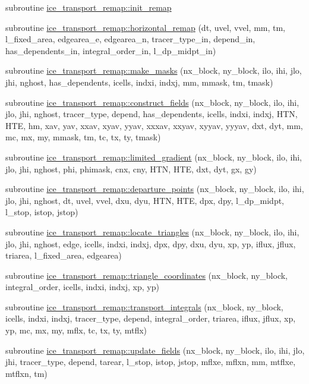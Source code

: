 \begin{DoxyCompactItemize}
\item 
subroutine \hyperlink{namespaceice__transport__remap_ae1b446db8b6220961bfcacd0c9b57fd4}{ice\_\-transport\_\-remap::init\_\-remap}
\item 
subroutine \hyperlink{namespaceice__transport__remap_af549caf7a8f27fcbe1cc3d9f8df4bacd}{ice\_\-transport\_\-remap::horizontal\_\-remap} (dt, uvel, vvel, mm, tm, l\_\-fixed\_\-area, edgearea\_\-e, edgearea\_\-n, tracer\_\-type\_\-in, depend\_\-in, has\_\-dependents\_\-in, integral\_\-order\_\-in, l\_\-dp\_\-midpt\_\-in)
\item 
subroutine \hyperlink{namespaceice__transport__remap_a9a9fe0af7f01eed20d6df09ed2e8dc2a}{ice\_\-transport\_\-remap::make\_\-masks} (nx\_\-block, ny\_\-block, ilo, ihi, jlo, jhi, nghost, has\_\-dependents, icells, indxi, indxj, mm, mmask, tm, tmask)
\item 
subroutine \hyperlink{namespaceice__transport__remap_a4c7f753ed3abe19124a7e719e3424dae}{ice\_\-transport\_\-remap::construct\_\-fields} (nx\_\-block, ny\_\-block, ilo, ihi, jlo, jhi, nghost, tracer\_\-type, depend, has\_\-dependents, icells, indxi, indxj, HTN, HTE, hm, xav, yav, xxav, xyav, yyav, xxxav, xxyav, xyyav, yyyav, dxt, dyt, mm, mc, mx, my, mmask, tm, tc, tx, ty, tmask)
\item 
subroutine \hyperlink{namespaceice__transport__remap_ad0f2932484bf98ec16810e79b50b9117}{ice\_\-transport\_\-remap::limited\_\-gradient} (nx\_\-block, ny\_\-block, ilo, ihi, jlo, jhi, nghost, phi, phimask, cnx, cny, HTN, HTE, dxt, dyt, gx, gy)
\item 
subroutine \hyperlink{namespaceice__transport__remap_a6b993110f808c259c52b05216684684f}{ice\_\-transport\_\-remap::departure\_\-points} (nx\_\-block, ny\_\-block, ilo, ihi, jlo, jhi, nghost, dt, uvel, vvel, dxu, dyu, HTN, HTE, dpx, dpy, l\_\-dp\_\-midpt, l\_\-stop, istop, jstop)
\item 
subroutine \hyperlink{namespaceice__transport__remap_a5ed79661ddd56d26d4e863b7ec1b9a0a}{ice\_\-transport\_\-remap::locate\_\-triangles} (nx\_\-block, ny\_\-block, ilo, ihi, jlo, jhi, nghost, edge, icells, indxi, indxj, dpx, dpy, dxu, dyu, xp, yp, iflux, jflux, triarea, l\_\-fixed\_\-area, edgearea)
\item 
subroutine \hyperlink{namespaceice__transport__remap_a0118e9be4eed6545abe6b6d08ebea458}{ice\_\-transport\_\-remap::triangle\_\-coordinates} (nx\_\-block, ny\_\-block, integral\_\-order, icells, indxi, indxj, xp, yp)
\item 
subroutine \hyperlink{namespaceice__transport__remap_a36c63f1390ec491939f47e64dab35e1e}{ice\_\-transport\_\-remap::transport\_\-integrals} (nx\_\-block, ny\_\-block, icells, indxi, indxj, tracer\_\-type, depend, integral\_\-order, triarea, iflux, jflux, xp, yp, mc, mx, my, mflx, tc, tx, ty, mtflx)
\item 
subroutine \hyperlink{namespaceice__transport__remap_a2f57bc59a0a273bc0c6aff4104b094c0}{ice\_\-transport\_\-remap::update\_\-fields} (nx\_\-block, ny\_\-block, ilo, ihi, jlo, jhi, tracer\_\-type, depend, tarear, l\_\-stop, istop, jstop, mflxe, mflxn, mm, mtflxe, mtflxn, tm)
\end{DoxyCompactItemize}
